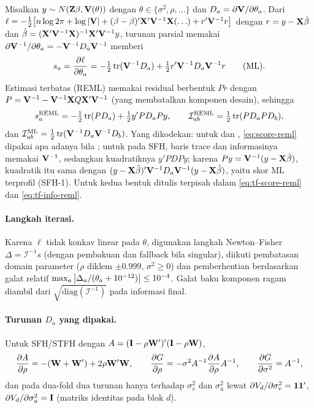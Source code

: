Misalkan $y\sim N(\mathbf{Z}\beta,\mathbf{V}(\theta))$ dengan
$\theta\in\{\sigma^2,\rho,\ldots\}$ dan
$D_a=\partial\mathbf{V}/\partial\theta_a$. Dari
$\ell=-\tfrac12\bigl[n\log2\pi+\log\left|\mathbf{V}\right|
+(\beta-\beta)'\mathbf{X}'\mathbf{V}^{-1}\mathbf{X}(\ldots)+r'\mathbf{V}^{-1}r\bigr]$ dengan
$r=y-\mathbf{X}\hat\beta$ dan
$\hat\beta=(\mathbf{X}'\mathbf{V}^{-1}\mathbf{X})^{-1}\mathbf{X}'\mathbf{V}^{-1}y$, turunan parsial memakai
$\partial\mathbf{V}^{-1}/\partial\theta_a=-\mathbf{V}^{-1}D_a\mathbf{V}^{-1}$ memberi
\begin{equation}
  s_a=\frac{\partial\ell}{\partial\theta_a}
  =-\tfrac12\operatorname{tr}(\mathbf{V}^{-1}D_a)+\tfrac12 r'\mathbf{V}^{-1}D_a\mathbf{V}^{-1}r
  \qquad\text{(ML)}.
  \label{eq:score-ml}
\end{equation}
Estimasi terbatas (REML) memakai residual berbentuk
$P r$ dengan $P=\mathbf{V}^{-1}-\mathbf{V}^{-1}\mathbf{X} Q\mathbf{X}'\mathbf{V}^{-1}$ (yang membatalkan
komponen desain), sehingga
\begin{equation}
  s_a^{\text{REML}}
  =-\tfrac12\operatorname{tr}(P D_a)+\tfrac12 y'P D_a P y,
  \qquad
  \mathcal I_{ab}^{\text{REML}}=\tfrac12\operatorname{tr}(P D_a P D_b),
  \label{eq:score-reml}
\end{equation}
dan $\mathcal I_{ab}^{\text{ML}}=\tfrac12\operatorname{tr}(\mathbf{V}^{-1}D_a\mathbf{V}^{-1}D_b)$.
Yang dikodekan: untuk  dan ,
\eqref{eq:score-reml} dipakai apa adanya bila ;
untuk  pada SFH, baris trace dan informasinya memakai
$\mathbf{V}^{-1}$, sedangkan kuadratiknya $y'PDPy$; karena $Py=\mathbf{V}^{-1}(y-\mathbf{X}\hat\beta)$,
kuadratik itu sama dengan $(y-\mathbf{X}\hat\beta)'\mathbf{V}^{-1}D_a\mathbf{V}^{-1}(y-\mathbf{X}\hat\beta)$, yaitu skor
ML terprofil (SFH-1). Untuk  kedua bentuk ditulis
terpisah dalam \eqref{eq:tf-score-reml} dan \eqref{eq:tf-info-reml}.

\paragraph{Langkah iterasi.} Karena $\ell$ tidak konkav linear pada
$\theta$, digunakan langkah Newton--Fisher
$\Delta=\mathcal I^{-1}s$ (dengan pembakuan  dan fallback
 bila singular), diikuti pembatasan domain parameter
($\rho$ diklem $\pm0.999$, $\sigma^2\ge0$) dan pemberhentian berdasarkan
galat relatif $\max_a\left|\Delta_a/(\theta_a+10^{-12})\right|\le10^{-4}$.
Galat baku komponen ragam diambil dari $\sqrt{\mathrm{diag}(\mathcal I^{-1})}$
pada informasi final.

\paragraph{Turunan $D_a$ yang dipakai.} Untuk SFH/STFH dengan
$A=(\mathbf{I}-\rho\mathbf{W}')'(\mathbf{I}-\rho\mathbf{W})$,
\begin{equation}
  \frac{\partial A}{\partial\rho}=-(\mathbf{W}+\mathbf{W}')+2\rho\mathbf{W}'\mathbf{W},
  \qquad
  \frac{\partial G}{\partial\rho}
  =-\sigma^2A^{-1}\frac{\partial A}{\partial\rho}A^{-1},
  \qquad
  \frac{\partial G}{\partial\sigma^2}=A^{-1},
  \label{eq:deriv-D}
\end{equation}
dan pada dua-fold dua turunan hanya terhadap $\sigma_v^2$ dan $\sigma_u^2$
lewat $\partial V_d/\partial\sigma_v^2=\mathbf{1}\mathbf{1}'$,
$\partial V_d/\partial\sigma_u^2=\mathbf{I}$ (matriks identitas pada blok $d$).

